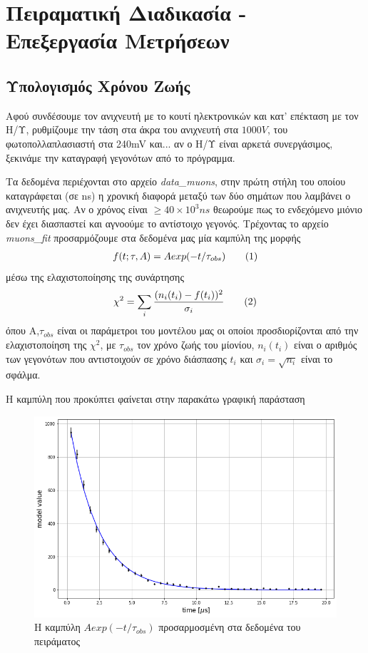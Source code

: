 \documentclass[a4paper]{book}
\newcommand\numberthis{\addtocounter{equation}{1}\tag{\theequation}}
\begin{document}
	
\section*{Πειραματική Διαδικασία - Επεξεργασία Μετρήσεων}
	\subsection*{Υπολογισμός Χρόνου Ζωής}
	Αφού συνδέσουμε τον ανιχνευτή με το κουτί ηλεκτρονικών και κατ' επέκταση με τον Η/Υ, ρυθμίζουμε την τάση στα άκρα του ανιχνευτή στα $1000V$, του φωτοπολλαπλασιαστή στα 240mV και... αν ο Η/Υ είναι αρκετά συνεργάσιμος, ξεκινάμε την καταγραφή γεγονότων από το πρόγραμμα.
	
	Τα δεδομένα περιέχονται στο αρχείο \textit{data\_muons}, στην πρώτη στήλη του οποίου καταγράφεται (σε ns) η χρονική διαφορά μεταξύ των δύο σημάτων που λαμβάνει ο ανιχνευτής μας. Αν ο χρόνος είναι $\geq 40\times10^3 ns$ θεωρούμε πως το ενδεχόμενο μιόνιο δεν έχει διασπαστεί και αγνοούμε το αντίστοιχο γεγονός. 
	Τρέχοντας το αρχείο \textit{muons\_fit} προσαρμόζουμε στα δεδομένα μας μία καμπύλη της μορφής 
	\begin{align*}\label{eq11}
		f(t;\tau,A) = Aexp(-t/\tau_{obs}) \numberthis
	\end{align*}
 μέσω της ελαχιστοποίησης της συνάρτησης 
 	\begin{align*}\label{eq12}
 		\chi^2 = \sum_i \frac{(n_i(t_i)-f(t_i))^2}{\sigma_i} \numberthis
 	\end{align*}
 όπου Α,$\tau_{obs}$ είναι οι παράμετροι του μοντέλου μας οι οποίοι προσδιορίζονται από την ελαχιστοποίηση της $\chi^2$, με $\tau_{obs}$ τον χρόνο ζωής του μίονίου,
  $n_i(t_i)$ είναι ο αριθμός των γεγονότων που αντιστοιχούν σε χρόνο διάσπασης $t_i$ και $\sigma_i = \sqrt{n_i}$ είναι το σφάλμα.
 
 Η καμπύλη που προκύπτει φαίνεται στην παρακάτω γραφική παράσταση 
 	\begin{figure}[h!]
 		\centering
 		\includegraphics[scale=0.6]{fitted_model.png}
 		\caption{Η καμπύλη $Aexp(-t/\tau_{obs})$ προσαρμοσμένη στα δεδομένα του πειράματος}
 		\label{fig1}
 	\end{figure}
 	
\end{document}

